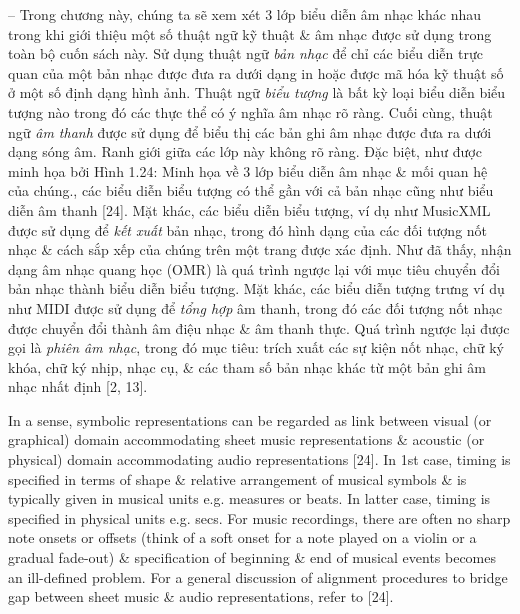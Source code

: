 \documentclass{article}
\begin{document}
\begin{itemize}
\begin{itemize}
		-- Trong chương này, chúng ta sẽ xem xét 3 lớp biểu diễn âm nhạc khác nhau trong khi giới thiệu một số thuật ngữ kỹ thuật \& âm nhạc được sử dụng trong toàn bộ cuốn sách này. Sử dụng thuật ngữ {\it bản nhạc} để chỉ các biểu diễn trực quan của một bản nhạc được đưa ra dưới dạng in hoặc được mã hóa kỹ thuật số ở một số định dạng hình ảnh. Thuật ngữ {\it biểu tượng} là bất kỳ loại biểu diễn biểu tượng nào trong đó các thực thể có ý nghĩa âm nhạc rõ ràng. Cuối cùng, thuật ngữ {\it âm thanh} được sử dụng để biểu thị các bản ghi âm nhạc được đưa ra dưới dạng sóng âm. Ranh giới giữa các lớp này không rõ ràng. Đặc biệt, như được minh họa bởi {\sf Hình 1.24: Minh họa về 3 lớp biểu diễn âm nhạc \& mối quan hệ của chúng.}, các biểu diễn biểu tượng có thể gần với cả bản nhạc cũng như biểu diễn âm thanh [24]. Mặt khác, các biểu diễn biểu tượng, ví dụ như MusicXML được sử dụng để {\it kết xuất} bản nhạc, trong đó hình dạng của các đối tượng nốt nhạc \& cách sắp xếp của chúng trên một trang được xác định. Như đã thấy, nhận dạng âm nhạc quang học (OMR) là quá trình ngược lại với mục tiêu chuyển đổi bản nhạc thành biểu diễn biểu tượng. Mặt khác, các biểu diễn tượng trưng ví dụ như MIDI được sử dụng để {\it tổng hợp} âm thanh, trong đó các đối tượng nốt nhạc được chuyển đổi thành âm điệu nhạc \& âm thanh thực. Quá trình ngược lại được gọi là {\it phiên âm nhạc}, trong đó mục tiêu: trích xuất các sự kiện nốt nhạc, chữ ký khóa, chữ ký nhịp, nhạc cụ, \& các tham số bản nhạc khác từ một bản ghi âm nhạc nhất định [2, 13].
		
		In a sense, symbolic representations can be regarded as link between visual (or graphical) domain accommodating sheet music representations \& acoustic (or physical) domain accommodating audio representations [24]. In 1st case, timing is specified in terms of shape \& relative arrangement of musical symbols \& is typically given in musical units e.g. measures or beats. In latter case, timing is specified in physical units e.g. secs. For music recordings, there are often no sharp note onsets or offsets (think of a soft onset for a note played on a violin or a gradual fade-out) \& specification of beginning \& end of musical events becomes an ill-defined problem. For a general discussion of alignment procedures to bridge gap between sheet music \& audio representations, refer to [24].
		

\end{itemize}
\end{itemize}
\end{document}
